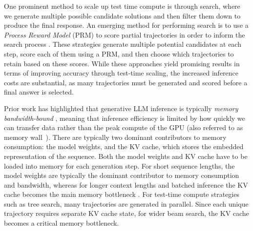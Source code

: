 One prominent method to scale up test time compute is through search, where we generate multiple possible candidate solutions and then filter them down to produce the final response.
An emerging method for performing search is to use a \textit{Process Reward Model} (PRM) to score partial trajectories in order to inform the search process \cite{snell2024scaling, beeching2024scalingtesttimecompute}.
These strategies generate multiple potential candidates at each step, score each of them using a PRM, and then choose which trajectories to retain based on these scores.
While these approaches yield promising results in terms of improving accuracy through test-time scaling, the increased inference costs are substantial, as many trajectories must be generated and scored before a final answer is selected.


Prior work has highlighted that generative LLM inference is typically \textit{memory bandwidth-bound} \cite{kim2023squeezellm,kim2023full, hooper2024squeezed}, meaning that inference efficiency is limited by how quickly we can transfer data rather than the peak compute of the GPU (also referred to as memory wall~\cite{gholami2024ai}).
There are typically two dominant contributors to memory consumption: the model weights, and the KV cache, which stores the embedded representation of the sequence.
Both the model weights and KV cache have to be loaded into memory for each generation step.
For short sequence lengths, the model weights are typically the dominant contributor to memory consumption and bandwidth, whereas for longer context lengths and batched inference the KV cache becomes the main memory bottleneck \cite{hooper2024kvquant}.
For test-time compute strategies such as tree search, many trajectories are generated in parallel. 
Since each unique trajectory requires separate KV cache state, for wider beam search, the KV cache becomes a critical memory bottleneck.

